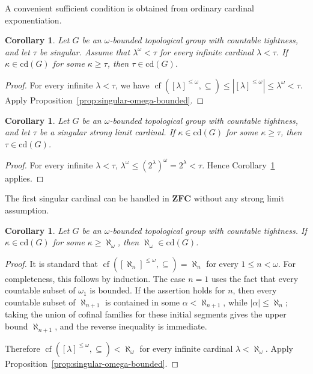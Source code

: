 \documentclass[12pt]{amsart}
\newtheorem{corollary}[theorem]{Corollary}
\theoremstyle{definition}
\numberwithin{equation}{section}
\theoremstyle{remark}
\def\cd{\mathrm{cd}}
\begin{document}
A convenient sufficient condition is obtained from ordinary cardinal
exponentiation.

\begin{corollary}\label{cor:singular-power-condition}
Let $G$ be an $\omega$-bounded topological group with countable tightness,
and let $\tau$ be singular. Assume that $\lambda^\omega<\tau$ for every
infinite cardinal $\lambda<\tau$. If $\kappa\in\cd(G)$ for some
$\kappa\geq\tau$, then $\tau\in\cd(G)$.
\end{corollary}

\begin{proof}
For every infinite $\lambda<\tau$, we have
$\operatorname{cf}([\lambda]^{\leq\omega},\subseteq)
\leq |[\lambda]^{\leq\omega}|
\leq\lambda^\omega<\tau$.
Apply Proposition~\ref{prop:singular-omega-bounded}.
\end{proof}

\begin{corollary}\label{cor:singular-strong-limit}
Let $G$ be an $\omega$-bounded topological group with countable tightness,
and let $\tau$ be a singular strong limit cardinal. If
$\kappa\in\cd(G)$ for some $\kappa\geq\tau$, then $\tau\in\cd(G)$.
\end{corollary}

\begin{proof}
For every infinite $\lambda<\tau$,
$\lambda^\omega\leq(2^\lambda)^\omega=2^\lambda<\tau$.
Hence Corollary~\ref{cor:singular-power-condition} applies.
\end{proof}

The first singular cardinal can be handled in $\mathbf{ZFC}$ without any
strong limit assumption.

\begin{corollary}\label{cor:aleph-omega}
Let $G$ be an $\omega$-bounded topological group with countable tightness.
If $\kappa\in\cd(G)$ for some $\kappa\geq\aleph_\omega$, then
$\aleph_\omega\in\cd(G)$.
\end{corollary}

\begin{proof}
It is standard that
$\operatorname{cf}([\aleph_n]^{\leq\omega},\subseteq)=\aleph_n$ for
every $1\leq n<\omega$. For completeness, this follows by induction.
The case $n=1$ uses the fact that every countable subset of $\omega_1$
is bounded. If the assertion holds for $n$, then every countable subset
of $\aleph_{n+1}$ is contained in some $\alpha<\aleph_{n+1}$, while
$|\alpha|\leq\aleph_n$; taking the union of cofinal families for these
initial segments gives the upper bound $\aleph_{n+1}$, and the reverse
inequality is immediate.

Therefore
$\operatorname{cf}([\lambda]^{\leq\omega},\subseteq)<\aleph_\omega$
for every infinite cardinal $\lambda<\aleph_\omega$. Apply
Proposition~\ref{prop:singular-omega-bounded}.
\end{proof}
\end{document}
